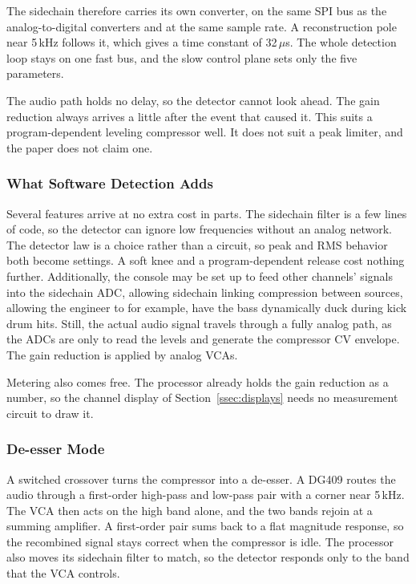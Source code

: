 \documentclass[11pt, letterpaper,titlepage]{article}
\begin{document}
The sidechain therefore carries its own converter, on the same SPI bus as the
analog-to-digital converters and at the same sample rate. A reconstruction pole
near 5\,kHz follows it, which gives a time constant of 32\,$\mu$s. The whole
detection loop stays on one fast bus, and the slow control plane sets only the
five parameters.

The audio path holds no delay, so the detector cannot look ahead. The gain
reduction always arrives a little after the event that caused it. This suits a
program-dependent leveling compressor well. It does not suit a peak limiter, and
the paper does not claim one.

\subsubsection*{What Software Detection Adds}
\label{sssec:comp-software}

Several features arrive at no extra cost in parts. The sidechain filter is a few
lines of code, so the detector can ignore low frequencies without an analog
network. The detector law is a choice rather than a circuit, so peak and RMS
behavior both become settings. A soft knee and a program-dependent release cost
nothing further. Additionally, the console may be set up to feed other channels' signals into the sidechain ADC, allowing sidechain linking compression between sources, allowing the engineer to for example, have the bass dynamically duck during kick drum hits. Still, the actual audio signal travels through a fully analog path, as the ADCs are only to read the levels and generate the compressor CV envelope. The gain reduction is applied by analog VCAs.

Metering also comes free. The processor already holds the gain reduction as a
number, so the channel display of Section~\ref{ssec:displays} needs no
measurement circuit to draw it.

\subsubsection*{De-esser Mode}
\label{sssec:comp-deess}

A switched crossover turns the compressor into a de-esser. A DG409 routes the
audio through a first-order high-pass and low-pass pair with a corner near
5\,kHz. The VCA then acts on the high band alone, and the two bands rejoin at a
summing amplifier. A first-order pair sums back to a flat magnitude response, so
the recombined signal stays correct when the compressor is idle. The processor
also moves its sidechain filter to match, so the detector responds only to the
band that the VCA controls.
\end{document}
